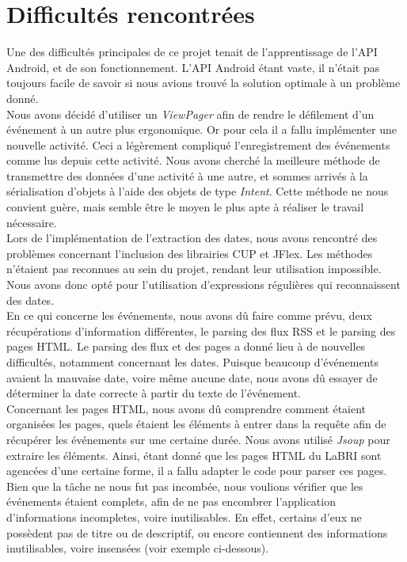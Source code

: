\chapter{Difficultés rencontrées}

Une des difficultés principales de ce projet tenait de l’apprentissage de l’API Android, et de son fonctionnement. L’API Android étant vaste, il n’était pas toujours facile de savoir si nous avions trouvé la solution optimale à un problème donné.\\
Nous avons décidé d'utiliser un \emph{ViewPager} afin de rendre le défilement d’un événement à un autre plus ergonomique. Or pour cela il a fallu implémenter une nouvelle activité. Ceci a légèrement compliqué l'enregistrement des événements comme lus depuis cette activité. Nous avons cherché la meilleure méthode de transmettre des données d’une activité à une autre, et sommes arrivés à la sérialisation d’objets à l'aide des objets de type \emph{Intent}. Cette méthode ne nous convient guère, mais semble être le moyen le plus apte à réaliser le travail nécessaire. \\

Lors de l’implémentation de l’extraction des dates, nous avons rencontré des problèmes concernant l’inclusion des librairies CUP et JFlex. Les méthodes n’étaient pas reconnues au sein du projet, rendant leur utilisation impossible.
Nous avons donc opté pour l'utilisation d'expressions régulières qui reconnaissent des dates. \\

En ce qui concerne les événements, nous avons dû faire comme prévu, deux récupérations d’information différentes, le parsing des flux RSS et le parsing des pages HTML.
Le parsing des flux et des pages a donné lieu à de nouvelles difficultés, notamment concernant les dates. Puisque beaucoup d'événements avaient la mauvaise date, voire même aucune date, nous avons dû essayer de déterminer la date correcte à partir du texte de l'événement. \\

Concernant les pages HTML, nous avons dû comprendre comment étaient organisées les pages, quels étaient les éléments à entrer dans la requête afin de récupérer les événements sur une certaine durée. Nous avons utilisé \emph{Jsoup} pour extraire les éléments. Ainsi, étant donné que les pages HTML du LaBRI sont agencées d'une certaine forme, il a fallu adapter le code pour parser ces pages.
Bien que la tâche ne nous fut pas incombée, nous voulions vérifier que les événements étaient complets, afin de ne pas encombrer l'application d'informations incompletes, voire inutilisables. En effet, certains d’eux ne possèdent pas de titre ou de descriptif, ou encore contiennent des informations inutilisables, voire insensées (voir exemple ci-dessous).

